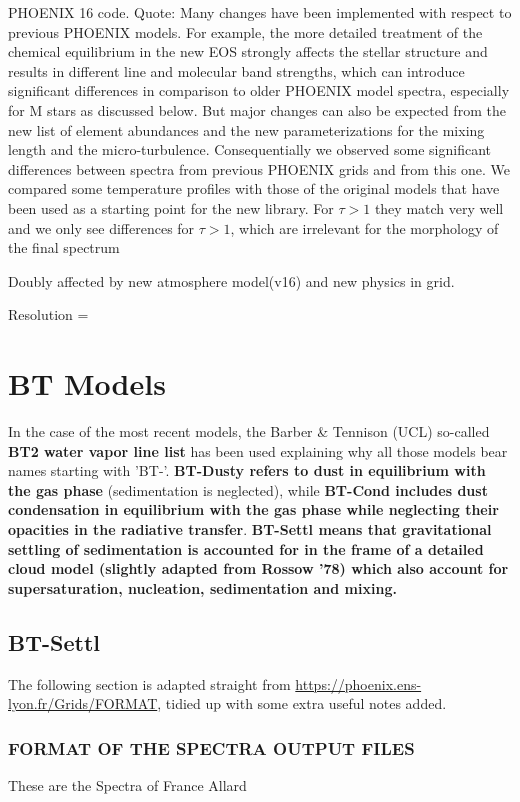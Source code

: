 \documentclass[12pt, a4paper]{article}
\begin{document}
PHOENIX 16 code.
Quote:
Many changes have been implemented with respect to previous
PHOENIX models. For example, the more detailed treatment of
the chemical equilibrium in  the  new EOS strongly affects  the
stellar structure and results in different line and molecular band
strengths, which can introduce significant differences in comparison to older PHOENIX model spectra, especially for M stars as
discussed below. But major changes can also be expected from
the new list of element abundances and the new parameterizations
for the mixing length and the micro-turbulence. Consequentially
we observed some significant differences between spectra from
previous PHOENIX grids and from this one.
We  compared some temperature profiles with those of the
original models that have been used as a starting point for the
new library. For \(\tau> 1\) they match very well and we only see
differences for \(\tau> 1\), which are irrelevant for the morphology
of the final spectrum


Doubly affected by new atmosphere model(v16) and new physics in grid. 

Resolution = 

\section{BT Models}

 In the case of the most recent models, the Barber \& Tennison (UCL) so-called \textbf{ BT2 water vapor line list} has been used explaining why all those models bear names starting with 'BT-'. \textbf{BT-Dusty refers to dust in equilibrium with the gas phase }(sedimentation is
 neglected), while \textbf{BT-Cond includes dust condensation in equilibrium with the gas phase while neglecting their opacities in the radiative transfer}. \textbf{BT-Settl means that gravitational settling of sedimentation is accounted for in the frame of a detailed cloud model (slightly adapted from Rossow '78) which also account for supersaturation, nucleation, sedimentation and mixing.}  


\subsection{BT-Settl}

The following section is adapted straight from \url{https://phoenix.ens-lyon.fr/Grids/FORMAT}, tidied up with some extra useful notes added.

\subsubsection{FORMAT OF THE SPECTRA OUTPUT FILES}
These are the Spectra of France Allard
\end{document}
